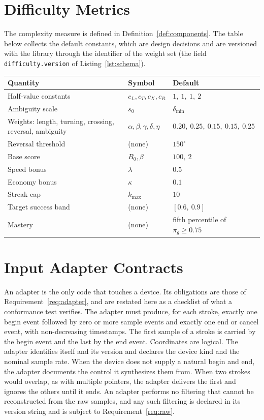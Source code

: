 \chapter{Difficulty Metrics}\label{app:difficulty}

The complexity measure is defined in Definition~\ref{def:components}. The table below collects the default constants, which are design decisions and are versioned with the library through the identifier of the weight set (the field \texttt{difficulty.version} of Listing~\ref{lst:schema}).

\begin{table}[h]
\centering
\small
\begin{tabularx}{\textwidth}{@{}Xll@{}}
\toprule
Quantity & Symbol & Default \\
\midrule
Half-value constants & $c_L,c_T,c_X,c_R$ & $1,\ 1,\ 1,\ 2$ \\
Ambiguity scale & $s_0$ & $\delta_{\min}$ \\
Weights: length, turning, crossing, reversal, ambiguity & $\alpha,\beta,\gamma,\delta,\eta$ & $0.20,\ 0.25,\ 0.15,\ 0.15,\ 0.25$ \\
Reversal threshold & (none) & $150^\circ$ \\
Base score & $B_0,\beta$ & $100,\ 2$ \\
Speed bonus & $\lambda$ & $0.5$ \\
Economy bonus & $\kappa$ & $0.1$ \\
Streak cap & $k_{\max}$ & $10$ \\
Target success band & (none) & $[0.6,\ 0.9]$ \\
Mastery & (none) & fifth percentile of $\pi_g\ge0.75$ \\
\bottomrule
\end{tabularx}
\end{table}

\chapter{Input Adapter Contracts}\label{app:adapters}

An adapter is the only code that touches a device. Its obligations are those of Requirement~\ref{req:adapter}, and are restated here as a checklist of what a conformance test verifies. The adapter must produce, for each stroke, exactly one begin event followed by zero or more sample events and exactly one end or cancel event, with non-decreasing timestamps. The first sample of a stroke is carried by the begin event and the last by the end event. Coordinates are logical. The adapter identifies itself and its version and declares the device kind and the nominal sample rate. When the device does not supply a natural begin and end, the adapter documents the control it synthesizes them from. When two strokes would overlap, as with multiple pointers, the adapter delivers the first and ignores the others until it ends. An adapter performs no filtering that cannot be reconstructed from the raw samples, and any such filtering is declared in its version string and is subject to Requirement~\ref{req:raw}.

